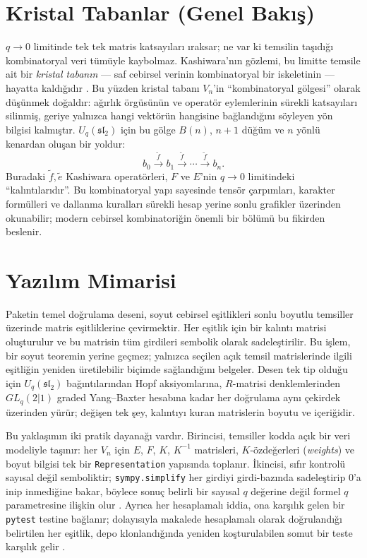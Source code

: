 \documentclass[10pt]{math}
\numberwithin{equation}{section}
\theoremstyle{plain}
\theoremstyle{definition}
\renewcommand{\sl}{\mathfrak{sl}}
\newcommand{\Uq}{U_q(\sl_2)}
\begin{document}
\section{Kristal Tabanlar (Genel Bakış)}

$q \to 0$ limitinde tek tek matris katsayıları ıraksar; ne var ki temsilin
taşıdığı kombinatoryal veri tümüyle kaybolmaz. Kashiwara'nın gözlemi, bu limitte temsile ait bir
\emph{kristal tabanın} --- saf cebirsel verinin kombinatoryal bir iskeletinin ---
hayatta kaldığıdır \cite{Kashiwara,HK}. Bu yüzden kristal tabanı $V_n$'in ``kombinatoryal gölgesi''
olarak düşünmek doğaldır: ağırlık örgüsünün ve operatör eylemlerinin sürekli
katsayıları silinmiş, geriye yalnızca hangi vektörün hangisine bağlandığını
söyleyen yön bilgisi kalmıştır. $\Uq$ için bu gölge $B(n)$, $n+1$ düğüm ve $n$
yönlü kenardan oluşan bir yoldur:
\[
  b_0 \xrightarrow{\tilde{f}} b_1 \xrightarrow{\tilde{f}} \cdots
  \xrightarrow{\tilde{f}} b_n.
\]
Buradaki $\tilde{f}, \tilde{e}$ Kashiwara operatörleri, $F$ ve $E$'nin
$q \to 0$ limitindeki ``kalıntılarıdır''. Bu kombinatoryal yapı sayesinde tensör
çarpımları, karakter formülleri ve dallanma kuralları sürekli hesap yerine
sonlu grafikler üzerinden okunabilir; modern cebirsel kombinatoriğin önemli bir
bölümü bu fikirden beslenir.

\section{Yazılım Mimarisi}

Paketin temel doğrulama deseni, soyut cebirsel eşitlikleri sonlu boyutlu
temsiller üzerinde matris eşitliklerine çevirmektir. Her eşitlik için bir kalıntı
matrisi oluşturulur ve bu matrisin tüm girdileri sembolik olarak sadeleştirilir.
Bu işlem, bir soyut teoremin yerine geçmez; yalnızca seçilen açık temsil
matrislerinde ilgili eşitliğin yeniden üretilebilir biçimde sağlandığını
belgeler. Desen tek tip olduğu için $\Uq$ bağıntılarından Hopf
aksiyomlarına, $R$-matrisi denklemlerinden $GL_q(2|1)$ graded Yang--Baxter
hesabına kadar her doğrulama aynı çekirdek üzerinden yürür; değişen tek şey,
kalıntıyı kuran matrislerin boyutu ve içeriğidir.

Bu yaklaşımın iki pratik dayanağı vardır. Birincisi, temsiller kodda açık bir
veri modeliyle taşınır: her $V_n$ için $E$, $F$, $K$, $K^{-1}$ matrisleri,
$K$-özdeğerleri (\emph{weights}) ve boyut bilgisi tek bir \texttt{Representation}
yapısında toplanır. İkincisi, sıfır kontrolü sayısal değil semboliktir;
\texttt{sympy.simplify} her girdiyi girdi-bazında sadeleştirip $0$'a inip
inmediğine bakar, böylece sonuç belirli bir sayısal $q$ değerine değil formel
$q$ parametresine ilişkin olur \cite{SymPy}. Ayrıca her hesaplamalı iddia, ona karşılık gelen bir
\texttt{pytest} testine bağlanır; dolayısıyla makalede hesaplamalı olarak
doğrulandığı belirtilen her eşitlik, depo klonlandığında yeniden koşturulabilen
somut bir teste karşılık gelir \cite{pytest}.
\end{document}
